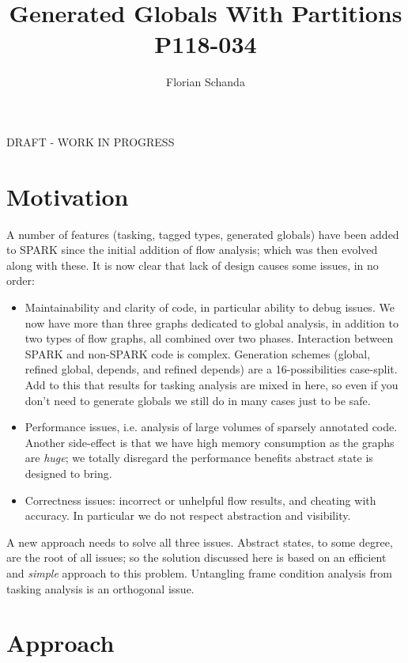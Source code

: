 \documentclass{article}
\author{Florian Schanda}
\title{Generated Globals With Partitions\\P118-034}
\begin{document}
\maketitle

\begin{center}
  \color{red} DRAFT - WORK IN PROGRESS
\end{center}

\tableofcontents

\section{Motivation}
A number of features (tasking, tagged types, generated globals) have been
added to SPARK since the initial addition of flow analysis; which was then
evolved along with these. It is now clear that lack of design causes some
issues, in no order:
\begin{itemize}
\item Maintainability and clarity of code, in particular ability to debug
  issues. We now have more than three graphs dedicated to global analysis,
  in addition to two types of flow graphs, all combined over two phases.
  Interaction between SPARK and non-SPARK code is complex. Generation
  schemes (global, refined global, depends, and refined depends) are a
  16-possibilities case-split. Add to this that results for tasking
  analysis are mixed in here, so even if you don't need to generate globals
  we still do in many cases just to be safe.

\item Performance issues, i.e. analysis of large volumes of sparsely
  annotated code. Another side-effect is that we have high memory
  consumption as the graphs are \emph{huge}; we totally disregard the
  performance benefits abstract state is designed to bring.

\item Correctness issues: incorrect or unhelpful flow results, and cheating
  with accuracy. In particular we do not respect abstraction and
  visibility.
\end{itemize}

A new approach needs to solve all three issues. Abstract states, to some
degree, are the root of all issues; so the solution discussed here is based
on an efficient and \emph{simple} approach to this problem. Untangling
frame condition analysis from tasking analysis is an orthogonal issue.

\pagebreak
\section{Approach}
\end{document}
